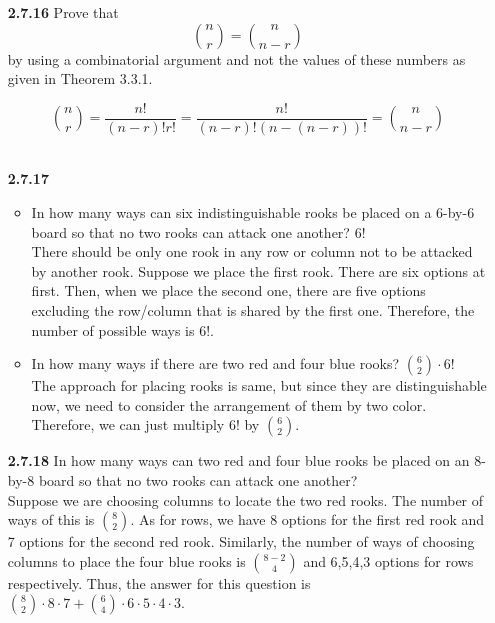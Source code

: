 \documentclass[12pt]{article}
\begin{document}


\begin{itemize}
    \item[\bf 2.7.16] Prove that $$\binom{n}{r}=\binom{n}{n-r}$$ by using a combinatorial argument and not the values of these numbers as given in Theorem 3.3.1. 
    
    $$\binom{n}{r}= \frac{n!}{(n-r)!r!}=\frac{n!}{(n-r)!(n-(n-r))!} = \binom{n}{n-r}$$\\
    
    
    \item[\bf 2.7.17] 
    \begin{itemize}
        \item In how many ways can six indistinguishable rooks be placed on a 6-by-6 board so that no two rooks can attack one another? $6!$\\
        
        There should be only one rook in any row or column not to be attacked by another rook. Suppose we place the first rook. There are six options at first. Then, when we place the second one, there are five options excluding the row/column that is shared by the first one. Therefore, the number of possible ways is 6!.\\
        
        \item In how many ways if there are two red and four blue rooks? $\binom{6}{2}\cdot 6!$\\
        
        The approach for placing rooks is same, but since they are distinguishable now, we need to consider the arrangement of them by two color. Therefore, we can just multiply 6! by $\binom{6}{2}$.
    \end{itemize} 
    
    \vspace{2\baselineskip}
    \item[\bf 2.7.18] In how many ways can two red and four blue rooks be placed on an 8-by-8 board so that no two rooks can attack one another?\\
    
    Suppose we are choosing columns to locate the two red rooks. The number of ways of this is $\binom{8}{2}$. As for rows, we have 8 options for the first red rook and 7 options for the second red rook. Similarly, the number of ways of choosing columns to place the four blue rooks is $\binom{8-2}{4}$ and 6,5,4,3 options for rows respectively. Thus, the answer for this question is $\binom{8}{2}\cdot8\cdot 7 + \binom{6}{4}\cdot 6\cdot 5\cdot 4\cdot 3$.
    

\end{itemize}
\end{document}
